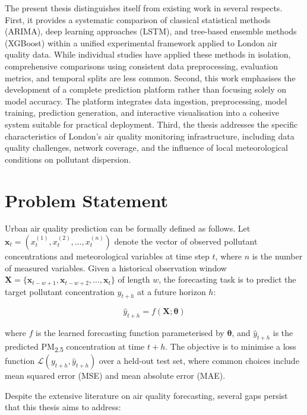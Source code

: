 The present thesis distinguishes itself from existing work in several respects. First, it provides a systematic comparison of classical statistical methods (ARIMA), deep learning approaches (LSTM), and tree-based ensemble methods (XGBoost) within a unified experimental framework applied to London air quality data. While individual studies have applied these methods in isolation, comprehensive comparisons using consistent data preprocessing, evaluation metrics, and temporal splits are less common. Second, this work emphasises the development of a complete prediction platform rather than focusing solely on model accuracy. The platform integrates data ingestion, preprocessing, model training, prediction generation, and interactive visualisation into a cohesive system suitable for practical deployment. Third, the thesis addresses the specific characteristics of London's air quality monitoring infrastructure, including data quality challenges, network coverage, and the influence of local meteorological conditions on pollutant dispersion.

\section{Problem Statement}
\label{sec:problem_statement}

Urban air quality prediction can be formally defined as follows. Let $\mathbf{x}_t = (x_t^{(1)}, x_t^{(2)}, \ldots, x_t^{(n)})$ denote the vector of observed pollutant concentrations and meteorological variables at time step $t$, where $n$ is the number of measured variables. Given a historical observation window $\mathbf{X} = \{\mathbf{x}_{t-w+1}, \mathbf{x}_{t-w+2}, \ldots, \mathbf{x}_t\}$ of length $w$, the forecasting task is to predict the target pollutant concentration $y_{t+h}$ at a future horizon $h$:

\begin{equation}
\hat{y}_{t+h} = f(\mathbf{X}; \boldsymbol{\theta})
\label{eq:forecasting}
\end{equation}

\noindent where $f$ is the learned forecasting function parameterised by $\boldsymbol{\theta}$, and $\hat{y}_{t+h}$ is the predicted PM\textsubscript{2.5} concentration at time $t+h$. The objective is to minimise a loss function $\mathcal{L}(y_{t+h}, \hat{y}_{t+h})$ over a held-out test set, where common choices include mean squared error (MSE) and mean absolute error (MAE).

Despite the extensive literature on air quality forecasting, several gaps persist that this thesis aims to address:

